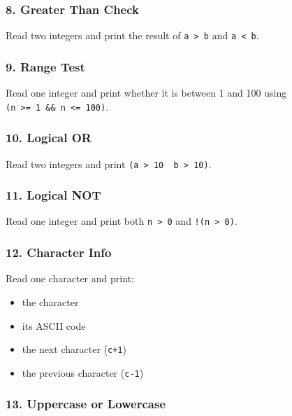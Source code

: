 \documentclass[
  letterpaper,
  DIV=11,
  numbers=noendperiod]{scrreprt}
\providecommand{\tightlist}{%
  \setlength{\itemsep}{0pt}\setlength{\parskip}{0pt}}
\begin{document}
\subsubsection{8. Greater Than Check}\label{greater-than-check}

Read two integers and print the result of \texttt{a\ \textgreater{}\ b}
and \texttt{a\ \textless{}\ b}.

\subsubsection{9. Range Test}\label{range-test}

Read one integer and print whether it is between 1 and 100 using
\texttt{(n\ \textgreater{}=\ 1\ \&\&\ n\ \textless{}=\ 100)}.

\subsubsection{10. Logical OR}\label{logical-or}

Read two integers and print
\texttt{(a\ \textgreater{}\ 10\ \textbar{}\textbar{}\ b\ \textgreater{}\ 10)}.

\subsubsection{11. Logical NOT}\label{logical-not}

Read one integer and print both \texttt{n\ \textgreater{}\ 0} and
\texttt{!(n\ \textgreater{}\ 0)}.

\subsubsection{12. Character Info}\label{character-info}

Read one character and print:

\begin{itemize}
\tightlist
\item
  the character
\item
  its ASCII code
\item
  the next character (\texttt{c+1})
\item
  the previous character (\texttt{c-1})
\end{itemize}

\subsubsection{13. Uppercase or Lowercase}\label{uppercase-or-lowercase}
\end{document}
